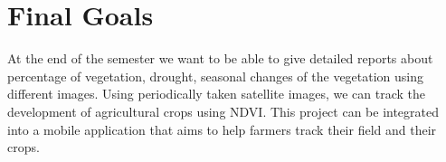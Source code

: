 \documentclass{article} %
\begin{document}
%
%
%
%
%
%

\section{Final Goals}

At the end of the semester we want to be able to give detailed reports about percentage of vegetation, drought, seasonal changes of the vegetation using different images. Using periodically taken satellite images, we can track the development of agricultural crops using NDVI. This project can be integrated into a mobile application that aims to help farmers track their field and their crops. 
\end{document}

